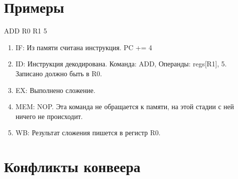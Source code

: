 \documentclass[12pt, a4paper]{article}
\begin{document}
\section{Примеры}
ADD R0 R1 5
\begin{enumerate}
    \item IF: Из памяти считана инструкция. PC += 4
    \item ID: Инструкция декодирована. Команда: ADD, Операнды: regs[R1], 5. Записано должно быть в R0.
    \item EX: Выполнено сложение.
    \item MEM: NOP. Эта команда не обращается к памяти, на этой стадии с ней ничего не происходит.
    \item WB: Результат сложения пишется в регистр R0.
\end{enumerate}
\section{Конфликты конвеера}
\end{document}
